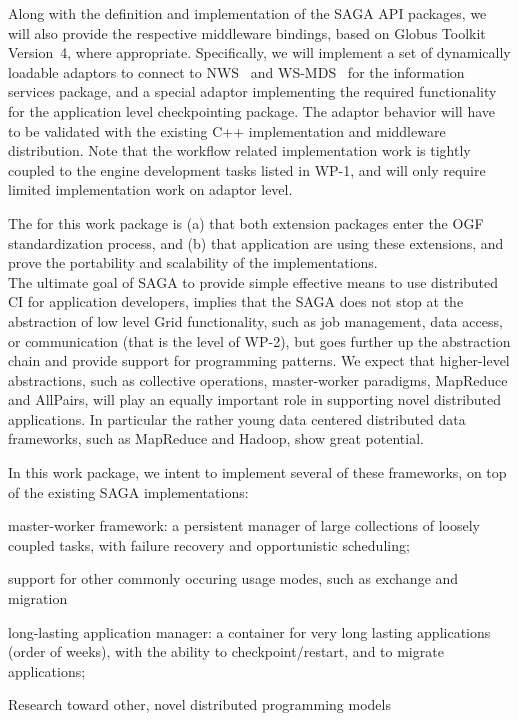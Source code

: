 \documentclass[10pt,letterpaper]{article}
\newcommand{\up}{\vspace*{-0.25em}}
\begin{document}
Along with the definition and implementation of the SAGA API packages,
we will also provide the respective middleware bindings, based on
Globus Toolkit Version~4, where appropriate.  Specifically, we will
implement a set of dynamically loadable adaptors to connect to
NWS~\cite{nws} and WS-MDS~\cite{globus_web} for the information
services package, and a special adaptor implementing the required
functionality for the application level checkpointing package.  The
adaptor behavior will have to be validated with the existing C++
implementation and middleware distribution.  Note that the workflow
related implementation work is tightly coupled to the engine
development tasks listed in WP-1, and will only require limited
implementation work on adaptor level.

The  for this work package is (a) that both
extension packages enter the OGF standardization process, and (b) that
application are using these extensions, and prove the portability and
scalability of the implementations.\\[-0.5em]  

 The ultimate goal of
SAGA to provide simple effective means to use distributed CI for
application developers, implies that the SAGA does not stop at the
abstraction of low level Grid functionality, such as job management,
data access, or communication (that is the level of WP-2), but goes
further up the abstraction chain and provide support for programming
patterns.  We expect that higher-level abstractions, such as
collective operations, master-worker paradigms, MapReduce and
AllPairs, will play an equally important role in supporting novel
distributed applications.  In particular the rather young data
centered distributed data frameworks, such as MapReduce and Hadoop,
show great potential.

In this work package, we intent to implement several of these
frameworks, on top of the existing SAGA implementations:

\begin{shortlist}
	\item master-worker framework: a persistent manager of large
  collections of loosely coupled tasks, with failure recovery and
  opportunistic scheduling;
  \item support for other commonly occuring usage modes, such as
  exchange and migration
	\item long-lasting application manager: a container for very long
  lasting applications (order of weeks), with the ability to 
  checkpoint/restart, and to migrate applications;
  \item Research toward other, novel distributed programming models
\end{shortlist}
\up
\end{document}
